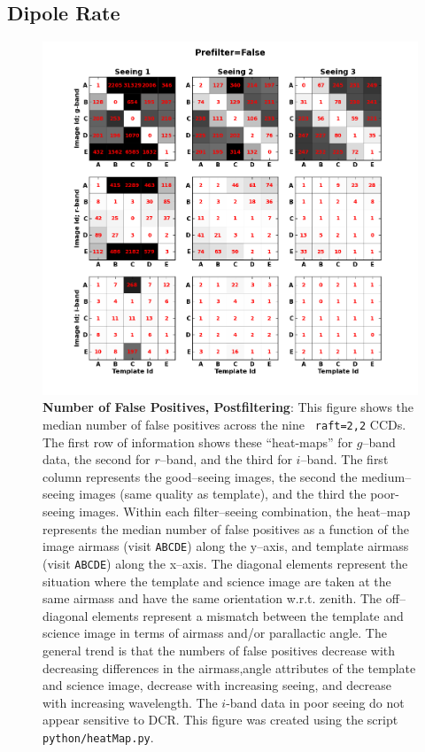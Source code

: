 \documentclass[DM,toc]{lsstdoc}
\def\A{{\tt A}}
\def\B{{\tt B}}
\def\C{{\tt C}}
\def\D{{\tt D}}
\def\E{{\tt E}}
\begin{document}
\subsection{Dipole Rate}


\begin{figure}[!ht]
  \centering
  \includegraphics[width=1.0\textwidth]{heatmapFalse.png}
  \caption{{\bf Number of False Positives, Postfiltering}: This figure
    shows the median number of false positives across the nine {\tt
      raft=2,2} CCDs.  The first row of information shows these
    ``heat-maps'' for $g$--band data, the second for $r$--band, and
    the third for $i$--band.  The first column represents the
    good--seeing images, the second the medium--seeing images (same
    quality as template), and the third the poor-seeing images.
    Within each filter--seeing combination, the heat--map represents
    the median number of false positives as a function of the image
    airmass (visit \A\B\C\D\E) along the y--axis, and template airmass
    (visit \A\B\C\D\E) along the x--axis.  The diagonal elements
    represent the situation where the template and science image are
    taken at the same airmass and have the same orientation
    w.r.t. zenith.  The off--diagonal elements represent a mismatch
    between the template and science image in terms of airmass and/or
    parallactic angle.  The general trend is that the numbers of false
    positives decrease with decreasing differences in the
    airmass,angle attributes of the template and science image,
    decrease with increasing seeing, and decrease with increasing
    wavelength.  The $i$-band data in poor seeing do not appear
    sensitive to DCR.  This figure was created using the script {\tt
      python/heatMap.py}.}
  \label{fig:heatpost}
\end{figure}
\end{document}
